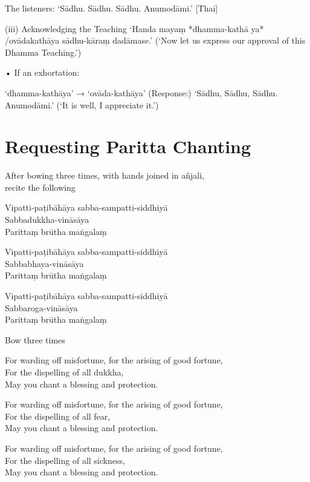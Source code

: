 The listeners:
‘Sādhu. Sādhu. Sādhu. Anumodāmi.’ [Thai]

(iii) Acknowledging the Teaching
‘Handa mayaṃ *dhamma-kathā ya* /ovādakathāya sādhu-kāraṃ dadāmase.’
(‘Now let us express our approval
of this Dhamma Teaching.’)

• If an exhortation:

‘dhamma-kathāya’ → ‘ovāda-kathāya’
(Response:)
‘Sādhu, Sādhu, Sādhu. Anumodāmi.’
(‘It is well, I appreciate it.’)

\chapter{Requesting Paritta Chanting}

\begin{instruction}
  After bowing three times, with hands joined in añjali,\\
  recite the following
\end{instruction}

Vipatti-paṭibāhāya sabba-sampatti-siddhiyā\\
Sabbadukkha-vināsāya\\
Parittaṃ brūtha maṅgalaṃ

Vipatti-paṭibāhāya sabba-sampatti-siddhiyā\\
Sabbabhaya-vināsāya\\
Parittaṃ brūtha maṅgalaṃ

Vipatti-paṭibāhāya sabba-sampatti-siddhiyā\\
Sabbaroga-vināsāya\\
Parittaṃ brūtha maṅgalaṃ

\begin{instruction}
  Bow three times
\end{instruction}

\begin{english}
For warding off misfortune, for the arising of good fortune,\\
For the dispelling of all dukkha,\\
May you chant a blessing and protection.

For warding off misfortune, for the arising of good fortune,\\
For the dispelling of all fear,\\
May you chant a blessing and protection.

For warding off misfortune, for the arising of good fortune,\\
For the dispelling of all sickness,\\
May you chant a blessing and protection.
\end{english}

